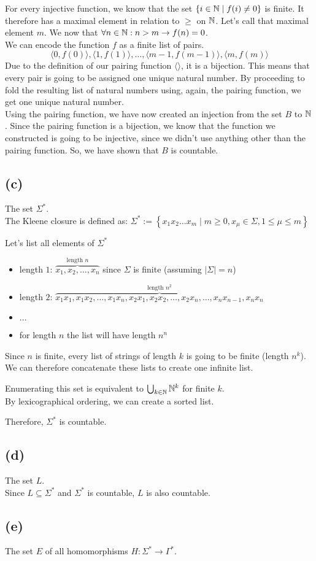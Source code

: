 For every injective function, we know that the set $\left\{ i \in \mathbb{N} \mid f(i) \neq 0 \right\}$ is finite. It therefore has a maximal element in relation to $\geq$ on $\mathbb{N}$. Let's call that maximal element $m$. We now that $\forall n \in \mathbb{N}: n>m\rightarrow f(n)=0$.\\
We can encode the function $f$ as a finite list of pairs.
$$\langle 0, f(0) \rangle, \langle 1, f(1) \rangle, \ldots, \langle m-1, f(m-1)\rangle, \langle m, f(m) \rangle$$
Due to the definition of our pairing function $\langle\rangle$, it is a bijection. This means that every pair is going to be assigned one unique natural number. By proceeding to fold the resulting list of natural numbers using, again, the pairing function, we get one unique natural number.\\
Using the pairing function, we have now created an injection from the set $B$ to $\mathbb{N}$. Since the pairing function is a bijection, we know that the function we constructed is going to be injective, since we didn't use anything other than the pairing function. So, we have shown that $B$ is countable.

\subsection{(c)}
The set $\Sigma^{\ast}$.\\
The Kleene closure is defined as: $\Sigma^{\ast}:= \left\{ x_{1}x_{2}\ldots x_{m} \mid m \geq 0, x_\mu \in \Sigma, 1 \leq \mu \leq m \right\}$

Let's list all elements of $\Sigma^{\ast}$
\begin{itemize}
    \item length $1$: $\overbrace{x_{1},x_{2},\ldots,x_{n}}^{\text{length } n}$ since $\Sigma$ is finite (assuming $\lvert \Sigma \rvert = n$)
    \item length $2$: $\overbrace{x_{1}x_{1}, x_{1}x_{2}, \ldots, x_{1}x_{n}, x_{2}x_{1}, x_{2}x_{2}, \ldots, x_{2}x_{n}, \ldots, x_{n}x_{n-1}, x_{n}x_{n}}^{\text{length }n^2}$
    \item $\ldots$
    \item for length $n$ the list will have length $n^{n}$
\end{itemize}

Since $n$ is finite, every list of strings of length $k$ is going to be finite (length $n^k$).\\
We can therefore concatenate these lists to create one infinite list.

Enumerating this set is equivalent to $\bigcup_{k\in \mathbb{N}}\mathbb{N}^{k}$ for finite $k$.\\
By lexicographical ordering, we can create a sorted list.

Therefore, $\Sigma^{\ast}$ is countable.

\subsection{(d)}
The set $L$.\\
Since $L \subseteq \Sigma^{\ast}$ and $\Sigma^{\ast}$ is countable, $L$ is also countable.

\subsection{(e)}
The set $E$ of all homomorphisms $H:\Sigma^{\ast}\rightarrow\Gamma^{\ast}$.


